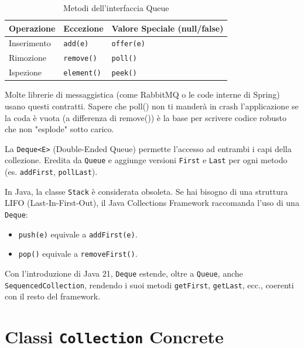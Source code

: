 \begin{table}[ht]
\centering
\begin{tabular}{|l|l|l|}
\hline
\textbf{Operazione} & \textbf{Eccezione} & \textbf{Valore Speciale (null/false)} \\ \hline
Inserimento         & \texttt{add(e)}    & \texttt{offer(e)}                    \\ \hline
Rimozione           & \texttt{remove()}  & \texttt{poll()}                     \\ \hline
Ispezione           & \texttt{element()} & \texttt{peek()}                     \\ \hline
\end{tabular}
\caption{Metodi dell'interfaccia Queue}
\end{table}

\begin{tip}
    Molte librerie di messaggistica (come RabbitMQ o le code interne di Spring) usano questi contratti. Sapere che poll() non ti manderà in crash l'applicazione se la coda è vuota (a differenza di remove()) è la base per scrivere codice robusto che non "esplode" sotto carico.
\end{tip}

La \texttt{Deque<E>} (Double-Ended Queue) permette l'accesso ad entrambi i capi della collezione. Eredita da \texttt{Queue} e aggiunge versioni \texttt{First} e \texttt{Last} per ogni metodo (es. \texttt{addFirst}, \texttt{pollLast}).

\begin{tip}
In Java, la classe \texttt{Stack} è considerata obsoleta. Se hai bisogno di una struttura LIFO (Last-In-First-Out), il Java Collections Framework raccomanda l'uso di una \texttt{Deque}:
\begin{itemize}
    \item \texttt{push(e)} equivale a \texttt{addFirst(e)}.
    \item \texttt{pop()} equivale a \texttt{removeFirst()}.
\end{itemize}
\end{tip}

\begin{observation}
Con l'introduzione di Java 21, \texttt{Deque} estende, oltre a \texttt{Queue}, anche \texttt{SequencedCollection}, rendendo i suoi metodi \texttt{getFirst}, \texttt{getLast}, ecc., coerenti con il resto del framework.
\end{observation}

\section{Classi \texttt{Collection} Concrete}

